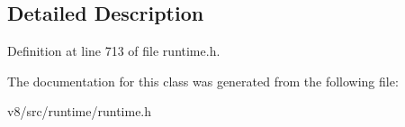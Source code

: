 \subsection{Detailed Description}


Definition at line 713 of file runtime.\+h.



The documentation for this class was generated from the following file\+:\begin{DoxyCompactItemize}
\item 
v8/src/runtime/runtime.\+h\end{DoxyCompactItemize}
